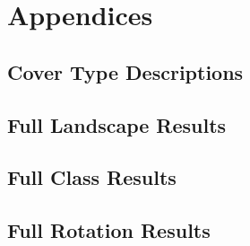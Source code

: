 \chapter{Appendices}

\section{Cover Type Descriptions}
\label{sec:covertypedesc}

\section{Full Landscape Results}
\label{sec:full-land-results}

\section{Full Class Results}
\label{sec:full-class-results}

\section{Full Rotation Results}
\label{sec:full-rot-results}